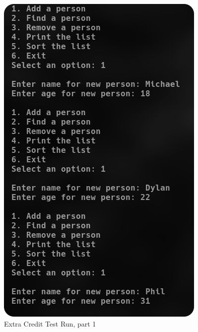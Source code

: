 \documentclass[
	letterpaper, %
	10pt, %
]{CSUniSchoolLabReport}
\begin{document}
\begin{figure}[H]
  \centering
  \includegraphics[width=.9\textwidth]{Figures/EC1.png}
  \caption{Extra Credit Test Run, part 1}
  \label{fig:1}
\end{figure}
\end{document}
